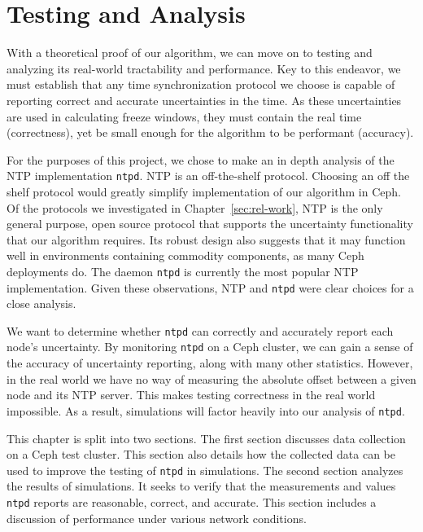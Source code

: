 \chapter{Testing and Analysis}
\label{sec:results}

With a theoretical proof of our algorithm, we can move on to
testing and analyzing its real-world tractability and performance. 
Key to this endeavor, we must establish that any time synchronization
protocol we choose is capable of reporting correct and accurate uncertainties
in the time. As these uncertainties are used in calculating freeze windows,
they must contain the real time (correctness), yet be small enough for the algorithm to 
be performant (accuracy). 

For the purposes of this project, we chose to make an in depth analysis of 
the NTP implementation \texttt{ntpd}. NTP is an off-the-shelf protocol. Choosing
an off the shelf protocol would greatly simplify implementation of our 
algorithm in Ceph. Of the protocols we investigated in Chapter~\ref{sec:rel-work}, 
NTP is the only general purpose, open source protocol that supports the 
uncertainty functionality that our algorithm requires. Its robust design
also suggests that it may function well in environments containing commodity 
components, as many Ceph deployments do. The daemon \texttt{ntpd} 
is currently the most popular NTP implementation. Given these observations, 
NTP and \texttt{ntpd} were clear choices for a close analysis.

We want to determine whether \texttt{ntpd} can 
correctly and accurately report each node's uncertainty. By monitoring 
\texttt{ntpd} on a Ceph cluster, we can gain a sense of the accuracy of
uncertainty reporting, along with many other statistics. However,
in the real world we have no way of measuring the absolute offset between
a given node and its NTP server. This makes testing correctness in the 
real world impossible. As a result, simulations will factor heavily into 
our analysis of \texttt{ntpd}.

This chapter is split into two sections. The first section discusses data collection 
on a Ceph test cluster. This section also details how the collected data
can be used to improve the testing of \texttt{ntpd} in simulations.
The second section analyzes the results of simulations. It seeks to verify that 
the measurements and values \texttt{ntpd} reports are reasonable, correct, and
accurate. This section includes a discussion of performance under various network conditions.  

